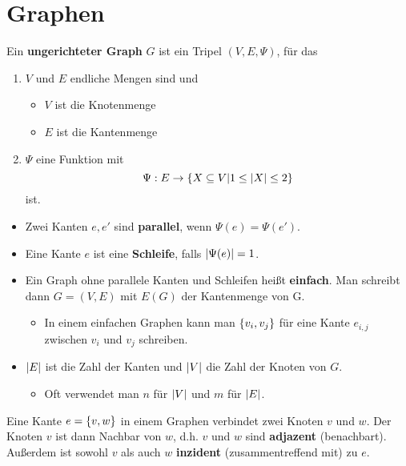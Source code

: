 \section{Graphen}
	\begin{definition*}
		Ein \textbf{ungerichteter Graph} $G$ ist ein Tripel $(V, E, \Psi)$, für das
		\begin{enumerate}
			\item $V$ und $E$ endliche Mengen sind und
		\begin{itemize}
				\item $V$ ist die Knotenmenge
				\item $E$ ist die Kantenmenge
			\end{itemize}
			\item $\Psi$ eine Funktion mit
			\begin{equation*}
				\Psi : E \to \{X \subseteq V \vert 1 \le \vert X \vert \le 2\}
			\end{equation*}
			ist.\\
		\end{enumerate}
		\begin{itemize}
				\item Zwei Kanten $e, e'$ sind \textbf{parallel}, wenn $\Psi(e) = \Psi(e')$.
				\item Eine Kante $e$ ist eine \textbf{Schleife}, falls $\vert \Psi(e) \vert = 1$.
				\item Ein Graph ohne parallele Kanten und Schleifen heißt \textbf{einfach}. Man schreibt dann $G = (V, E)$ mit $E(G)$ der Kantenmenge von G.
				\begin{itemize}[$\hookrightarrow$]
					\item  In einem einfachen Graphen kann man $\{v_i, v_j\}$ für eine Kante $e_{i,j}$ zwischen $v_i$ und $v_j$ schreiben.
				\end{itemize}
				\item $\vert E \vert$ ist die Zahl der Kanten und $\vert V \vert$ die Zahl der Knoten von $G$.
				\begin{itemize}[$\hookrightarrow$]
					\item Oft verwendet man $n$ für $\vert V \vert$ und $m$ für $\vert E \vert$.
				\end{itemize}
			\end{itemize}
	\end{definition*}
	\begin{definition*}
		Eine Kante $e = \{v, w\}$ in einem Graphen verbindet zwei Knoten $v$ und $w$. Der Knoten $v$ ist dann Nachbar von $w$, d.h. $v$ und $w$ sind \textbf{adjazent} (\dq benachbart\dq). Außerdem ist sowohl $v$ als auch $w$ \textbf{inzident} (\dq zusammentreffend mit\dq) zu $e$.
	\end{definition*}
